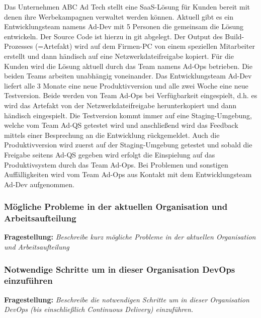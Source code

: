 Das Unternehmen ABC Ad Tech stellt eine SaaS-Lösung für Kunden bereit mit denen ihre
Werbekampagnen verwaltet werden können.
Aktuell gibt es ein Entwicklungsteam namens  Ad-Dev  mit 5 Personen die gemeinsam die
Lösung entwickeln. Der Source Code ist hierzu in git abgelegt. Der Output des Build-Prozesses
(=Artefakt) wird auf dem Firmen-PC von einem speziellen Mitarbeiter erstellt und dann
händisch auf eine Netzwerkdateifreigabe kopiert.
Für die Kunden wird die Lösung aktuell durch das Team namens Ad-Ops betrieben.
Die beiden Teams arbeiten unabhängig voneinander.
Das Entwicklungsteam Ad-Dev liefert alle 3 Monate eine neue Produktivversion und alle
zwei Woche eine neue Testversion. Beide werden von Team Ad-Ops bei Verfügbarkeit
eingespielt, d.h. es wird das Artefakt von der Netzwerkdateifreigabe herunterkopiert und dann
händisch eingespielt. Die Testversion kommt immer auf eine Staging-Umgebung, welche
vom Team Ad-QS getestet wird und anschließend wird das Feedback mittels einer
Besprechung an die Entwicklung rückgemeldet. Auch die Produktivversion wird zuerst auf der
Staging-Umgebung getestet und sobald die Freigabe seitens  Ad-QS  gegeben wird erfolgt die
Einspielung auf das Produktivsystem durch das Team Ad-Ops. Bei Problemen und sonstigen
Auffälligkeiten wird vom Team  Ad-Ops  aus Kontakt mit dem Entwicklungsteam  Ad-Dev 
aufgenommen.\\


\subsubsection{Mögliche Probleme in der aktuellen Organisation und Arbeitsaufteilung}

\textbf{Fragestellung:} \textit{Beschreibe kurz mögliche Probleme in der aktuellen Organisation und Arbeitsaufteilung}
    

\subsubsection{Notwendige Schritte um in dieser Organisation DevOps einzuführen}
\textbf{Fragestellung:} \textit{Beschreibe die notwendigen Schritte um in dieser Organisation DevOps (bis einschließlich
Continuous Delivery) einzuführen.}

